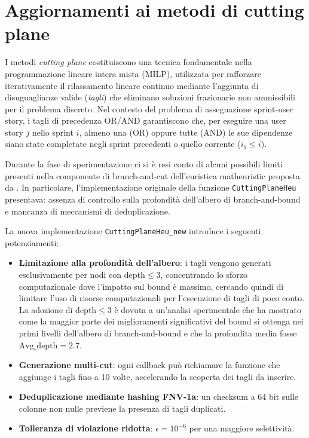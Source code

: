 \documentclass[12pt,a4paper,openright,twoside]{book}
\begin{document}
\section{Aggiornamenti ai metodi di cutting plane}\label{sec:newheu}

I metodi \emph{cutting plane} costituiscono una tecnica fondamentale nella programmazione lineare intera mista (MILP), utilizzata per rafforzare iterativamente il rilassamento lineare continuo mediante l'aggiunta di disuguaglianze valide (\emph{tagli}) che eliminano soluzioni frazionarie non ammissibili per il problema discreto. Nel contesto del problema di assegnazione sprint-user story, i tagli di precedenza OR/AND garantiscono che, per eseguire una user story $j$ nello sprint $i$, almeno una (OR) oppure tutte (AND) le sue dipendenze siano state completate negli sprint precedenti o quello corrente ($i_1 \leq i$).

Durante la fase di sperimentazione ci si è resi conto di alcuni possibili limiti presenti nella componente di branch-and-cut dell'euristica matheuristic proposta da \cite{BOSCHETTI2014116}. In particolare, l'implementazione originale della funzione \texttt{CuttingPlaneHeu} presentava: assenza di controllo sulla profondità dell'albero di branch-and-bound e mancanza di meccanismi di deduplicazione.

La nuova implementazione \texttt{CuttingPlaneHeu\_new} introduce i seguenti potenziamenti:

\begin{itemize}
\item \textbf{Limitazione alla profondità dell'albero}: i tagli vengono generati esclusivamente per nodi con $\text{depth} \leq 3$, concentrando lo sforzo computazionale dove l'impatto sul bound è massimo, cercando quindi di limitare l'uso di risorse computazionali per l'esecuzione di tagli di poco conto. La adozione di $\text{depth} \leq 3$ è dovuta a un'analisi sperimentale che ha mostrato come la maggior parte dei miglioramenti significativi del bound si ottenga nei primi livelli dell'albero di branch-and-bound e che la profondita media fosse $\text{Avg\_depth} = 2.7$.
\item \textbf{Generazione multi-cut}: ogni callback può richiamare la funzione che aggiunge i tagli fino a 10 volte, accelerando la scoperta dei tagli da inserire.
\item \textbf{Deduplicazione mediante hashing FNV-1a}: un checksum a 64 bit sulle colonne non nulle previene la presenza di tagli duplicati.
\item \textbf{Tolleranza di violazione ridotta}: $\epsilon = 10^{-6}$ per una maggiore selettività.
\end{itemize}
\end{document}
